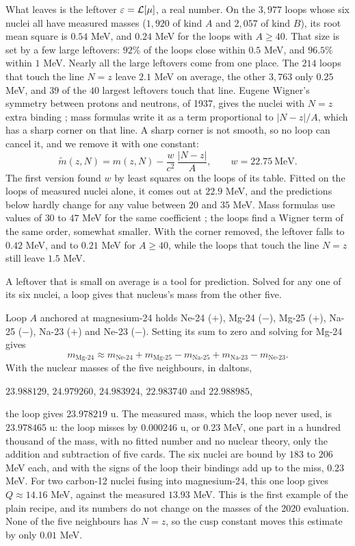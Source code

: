 What  leaves is the leftover $\varepsilon = \mathcal{L}[\mu]$, a real number. On the $3{,}977$ loops whose six nuclei all have measured masses ($1{,}920$ of kind $A$ and $2{,}057$ of kind $B$), its root mean square is $0.54$ MeV, and $0.24$ MeV for the loops with $A \ge 40$. That size is set by a few large leftovers: $92\%$ of the loops close within $0.5$ MeV, and $96.5\%$ within $1$ MeV. Nearly all the large leftovers come from one place. The $214$ loops that touch the line $N = z$ leave $2.1$ MeV on average, the other $3{,}763$ only $0.25$ MeV, and $39$ of the $40$ largest leftovers touch that line. Eugene Wigner's symmetry between protons and neutrons, of 1937, gives the nuclei with $N = z$ extra binding \citep{Wigner1937}; mass formulas write it as a term proportional to $|N - z|/A$, which has a sharp corner on that line. A sharp corner is not smooth, so no loop can cancel it, and we remove it with one constant:
\[
\tilde{m}(z, N) = m(z, N) - \frac{w}{c^2}\,\frac{|N - z|}{A}, \qquad w = 22.75\ \text{MeV}.
\]
The first version found $w$ by least squares on the loops of its table. Fitted on the loops of measured nuclei alone, it comes out at $22.9$ MeV, and the predictions below hardly change for any value between $20$ and $35$ MeV. Mass formulas use values of $30$ to $47$ MeV for the same coefficient \citep{Satula1997}; the loops find a Wigner term of the same order, somewhat smaller. With the corner removed, the leftover falls to $0.42$ MeV, and to $0.21$ MeV for $A \ge 40$, while the loops that touch the line $N = z$ still leave $1.5$ MeV.

A leftover that is small on average is a tool for prediction. Solved for any one of its six nuclei, a loop gives that nucleus's mass from the other five.

\begin{workedexample}
Loop $A$ anchored at magnesium-24 holds Ne-24 ($+$), Mg-24 ($-$), Mg-25 ($+$), Na-25 ($-$), Na-23 ($+$) and Ne-23 ($-$). Setting its sum to zero and solving for Mg-24 gives
\[
m_{\text{Mg-24}} \approx m_{\text{Ne-24}} + m_{\text{Mg-25}} - m_{\text{Na-25}} + m_{\text{Na-23}} - m_{\text{Ne-23}} .
\]
With the nuclear masses of the five neighbours, in daltons,
\begin{center}
\small
$23.988129$, $24.979260$, $24.983924$, $22.983740$ and $22.988985$,
\end{center}
the loop gives $23.978219$ u. The measured mass, which the loop never used, is $23.978465$ u: the loop misses by $0.000246$ u, or $0.23$ MeV, one part in a hundred thousand of the mass, with no fitted number and no nuclear theory, only the addition and subtraction of five cards. The six nuclei are bound by $183$ to $206$ MeV each, and with the signs of the loop their bindings add up to the miss, $0.23$ MeV. For two carbon-12 nuclei fusing into magnesium-24, this one loop gives $Q \approx 14.16$ MeV, against the measured $13.93$ MeV. This is the first example of the plain recipe, and its numbers do not change on the masses of the 2020 evaluation. None of the five neighbours has $N = z$, so the cusp constant moves this estimate by only $0.01$ MeV.
\end{workedexample}

